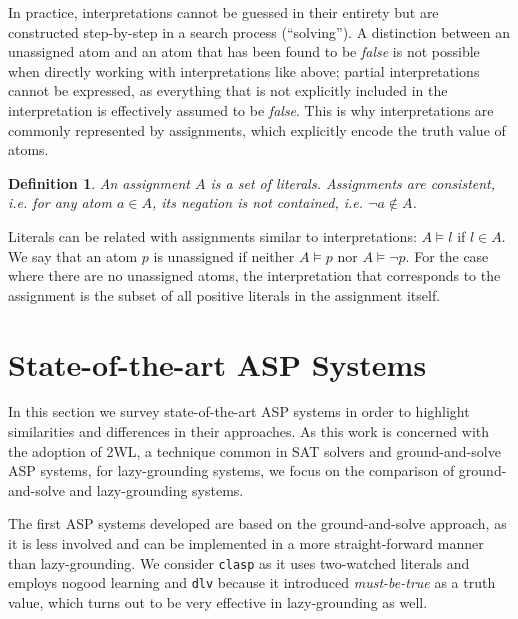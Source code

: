 \documentclass{vutinfth} %
\newtheorem{definition}{Definition}[chapter]
\newcommand{\mbt}{must-be-true\xspace}
\newcommand{\ass}{A}
\newcommand{\clasp}{\texttt{clasp}\xspace}
\newcommand{\dlv}{\texttt{dlv}\xspace}
\begin{document}
In practice, interpretations cannot be guessed in their entirety but are constructed step-by-step in a search process (\enquote{solving}). A distinction between an unassigned atom and an atom that has been found to be \emph{false} is not possible when directly working with interpretations like above; partial interpretations cannot be expressed, as everything that is not explicitly included in the interpretation is effectively assumed to be \emph{false}. This is why interpretations are commonly represented by assignments, which explicitly encode the truth value of atoms.

\begin{definition}
An \emph{assignment} $\ass$ is a set of literals. Assignments are consistent, i.e. for any atom $a \in \ass$, its negation is not contained, i.e. $\neg a \not \in \ass$.
\end{definition}

Literals can be related with assignments similar to interpretations: $A \models l$ if $l \in A$. We say that an atom $p$ is unassigned if neither $A \models p$ nor $A \models \neg p$. For the case where there are no unassigned atoms, the interpretation that corresponds to the assignment is the subset of all positive literals in the assignment itself.


\section{State-of-the-art ASP Systems}

In this section we survey state-of-the-art ASP systems in order to highlight similarities and differences in their approaches. As this work is concerned with the adoption of 2WL, a technique common in SAT solvers and ground-and-solve ASP systems, for lazy-grounding systems, we focus on the comparison of ground-and-solve and lazy-grounding systems.

The first ASP systems developed are based on the ground-and-solve approach, as it is less involved and can be implemented in a more straight-forward manner than lazy-grounding. We consider \clasp as it uses two-watched literals and employs nogood learning and \dlv because it introduced \emph{\mbt} as a truth value, which turns out to be very effective in lazy-grounding as well.
\end{document}
